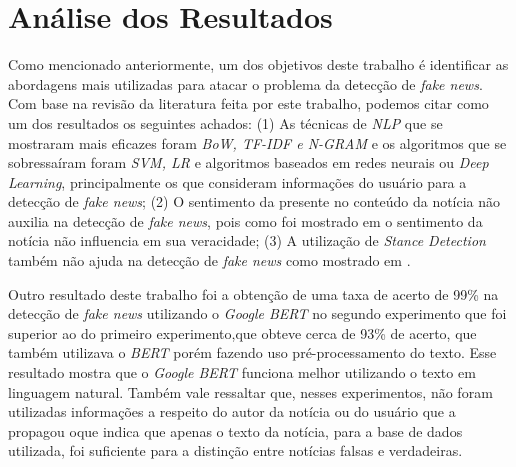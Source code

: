 \section{Análise dos Resultados}




Como mencionado anteriormente, um dos objetivos deste trabalho é identificar as abordagens mais utilizadas para atacar o problema da detecção de \textit{fake news}. Com base na revisão da literatura feita por este trabalho, podemos citar como um dos resultados os seguintes achados: (1) As técnicas  de \textit{NLP} que se mostraram mais eficazes foram \textit{BoW, TF-IDF e N-GRAM} e os algoritmos que se sobressaíram foram \textit{SVM, LR} e algoritmos baseados em redes neurais ou \textit{Deep Learning}, principalmente os que consideram informações do usuário para a detecção de \textit{fake news};  (2) O sentimento da presente no conteúdo da notícia não auxilia na detecção de \textit{fake news}, pois como foi mostrado em \citep{baarir2020} o sentimento da notícia não influencia em sua veracidade; (3) A utilização de \textit{Stance Detection} também não ajuda na detecção de \textit{fake news} como mostrado em \citep{DeMagistris2022}.

Outro resultado deste trabalho foi a obtenção de uma taxa de acerto de 99\% na detecção de \textit{fake news} utilizando o \textit{Google BERT} no segundo experimento que foi superior ao do primeiro experimento,que obteve cerca de 93\% de acerto, que também utilizava o \textit{BERT} porém fazendo uso pré-processamento do texto. Esse resultado mostra que o \textit{Google BERT} funciona melhor utilizando o texto em linguagem natural. Também vale ressaltar que, nesses experimentos, não foram utilizadas informações a respeito do autor da notícia ou do usuário que a propagou oque indica que apenas o texto da notícia, para a base de dados utilizada, foi suficiente para a distinção entre notícias falsas e verdadeiras. 